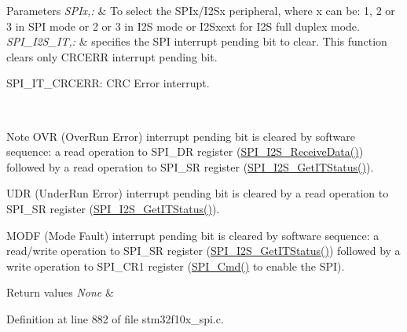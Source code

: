 \begin{DoxyParams}{Parameters}
{\em S\-P\-Ix,\-:} & To select the S\-P\-Ix/\-I2\-Sx peripheral, where x can be\-: 1, 2 or 3 in S\-P\-I mode or 2 or 3 in I2\-S mode or I2\-Sxext for I2\-S full duplex mode. \\
\hline
{\em S\-P\-I\-\_\-\-I2\-S\-\_\-\-I\-T,\-:} & specifies the S\-P\-I interrupt pending bit to clear. This function clears only C\-R\-C\-E\-R\-R interrupt pending bit. \begin{DoxyItemize}
\item S\-P\-I\-\_\-\-I\-T\-\_\-\-C\-R\-C\-E\-R\-R\-: C\-R\-C Error interrupt.\end{DoxyItemize}
\\
\hline
\end{DoxyParams}
\begin{DoxyNote}{Note}
O\-V\-R (Over\-Run Error) interrupt pending bit is cleared by software sequence\-: a read operation to S\-P\-I\-\_\-\-D\-R register (\hyperlink{group___s_p_i___exported___functions_gab77de76547f3bff403236b263b070a30}{S\-P\-I\-\_\-\-I2\-S\-\_\-\-Receive\-Data()}) followed by a read operation to S\-P\-I\-\_\-\-S\-R register (\hyperlink{group___s_p_i___exported___functions_ga72decbc1cd79f8fad92a2204beca6bc5}{S\-P\-I\-\_\-\-I2\-S\-\_\-\-Get\-I\-T\-Status()}). 

U\-D\-R (Under\-Run Error) interrupt pending bit is cleared by a read operation to S\-P\-I\-\_\-\-S\-R register (\hyperlink{group___s_p_i___exported___functions_ga72decbc1cd79f8fad92a2204beca6bc5}{S\-P\-I\-\_\-\-I2\-S\-\_\-\-Get\-I\-T\-Status()}). 

M\-O\-D\-F (Mode Fault) interrupt pending bit is cleared by software sequence\-: a read/write operation to S\-P\-I\-\_\-\-S\-R register (\hyperlink{group___s_p_i___exported___functions_ga72decbc1cd79f8fad92a2204beca6bc5}{S\-P\-I\-\_\-\-I2\-S\-\_\-\-Get\-I\-T\-Status()}) followed by a write operation to S\-P\-I\-\_\-\-C\-R1 register (\hyperlink{group___s_p_i___exported___functions_gaa31357879a65ee1ed7223f3b9114dcf3}{S\-P\-I\-\_\-\-Cmd()} to enable the S\-P\-I). 
\end{DoxyNote}

\begin{DoxyRetVals}{Return values}
{\em None} & \\
\hline
\end{DoxyRetVals}


Definition at line 882 of file stm32f10x\-\_\-spi.\-c.

